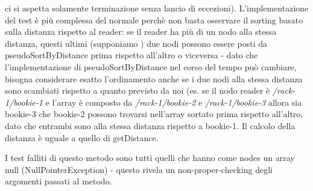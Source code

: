 \documentclass[10pt, a4paper]{article}
\begin{document}
	ci si aspetta solamente terminazione senza lancio di eccezioni). 
	L'implementazione del test è più complessa del normale perchè
	non basta osservare il sorting basato sulla distanza rispetto al reader:
	se il reader ha più di un nodo alla stessa distanza, questi ultimi (supponiamo ) due nodi possono essere posti da pseudoSortByDistance prima rispetto all'altro
	o viceversa - dato che l'implementazione di pseudoSortByDistance nel corso del tempo può cambiare,
	bisogna considerare esatto l'ordinamento anche se i due nodi alla stessa
	distanza sono scambiati rispetto a quanto previsto da noi (es. 
	se il nodo reader è \textit{/rack-1/bookie-1} e l'array è composto da \textit{/rack-1/bookie-2} e \textit{/rack-1/bookie-3} allora sia bookie-3 che bookie-2 possono 
	trovarsi nell'array sortato prima rispetto all'altro, dato che entrambi sono
	alla stessa distanza rispetto a bookie-1.
	Il calcolo della distanza è uguale a
	quello di getDistance.
	
	I test falliti di questo metodo sono tutti quelli che hanno come nodes 
	un array null (NullPointerException) - questo rivela un non-proper-checking
	degli argomenti passati al metodo.
	
\end{document}
